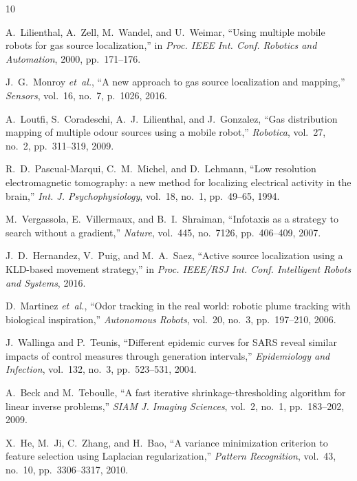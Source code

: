 \documentclass[conference]{IEEEtran}
\begin{document}

\begin{thebibliography}{10}

A.~Lilienthal, A.~Zell, M.~Wandel, and U.~Weimar,
``Using multiple mobile robots for gas source localization,''
in \emph{Proc. IEEE Int. Conf. Robotics and Automation}, 2000, pp.~171--176.

J.~G.~Monroy \emph{et~al.},
``A new approach to gas source localization and mapping,''
\emph{Sensors}, vol.~16, no.~7, p.~1026, 2016.

A.~Loutfi, S.~Coradeschi, A.~J.~Lilienthal, and J.~Gonzalez,
``Gas distribution mapping of multiple odour sources using a mobile robot,''
\emph{Robotica}, vol.~27, no.~2, pp.~311--319, 2009.

R.~D.~Pascual-Marqui, C.~M.~Michel, and D.~Lehmann,
``Low resolution electromagnetic tomography: a new method for localizing electrical activity in the brain,''
\emph{Int. J. Psychophysiology}, vol.~18, no.~1, pp.~49--65, 1994.

M.~Vergassola, E.~Villermaux, and B.~I.~Shraiman,
``Infotaxis as a strategy to search without a gradient,''
\emph{Nature}, vol.~445, no.~7126, pp.~406--409, 2007.

J.~D.~Hernandez, V.~Puig, and M.~A.~Saez,
``Active source localization using a KLD-based movement strategy,''
in \emph{Proc. IEEE/RSJ Int. Conf. Intelligent Robots and Systems}, 2016.

D.~Martinez \emph{et~al.},
``Odor tracking in the real world: robotic plume tracking with biological inspiration,''
\emph{Autonomous Robots}, vol.~20, no.~3, pp.~197--210, 2006.

J.~Wallinga and P.~Teunis,
``Different epidemic curves for SARS reveal similar impacts of control measures through generation intervals,''
\emph{Epidemiology and Infection}, vol.~132, no.~3, pp.~523--531, 2004.

A.~Beck and M.~Teboulle,
``A fast iterative shrinkage-thresholding algorithm for linear inverse problems,''
\emph{SIAM J. Imaging Sciences}, vol.~2, no.~1, pp.~183--202, 2009.

X.~He, M.~Ji, C.~Zhang, and H.~Bao,
``A variance minimization criterion to feature selection using Laplacian regularization,''
\emph{Pattern Recognition}, vol.~43, no.~10, pp.~3306--3317, 2010.

\end{thebibliography}
\end{document}
